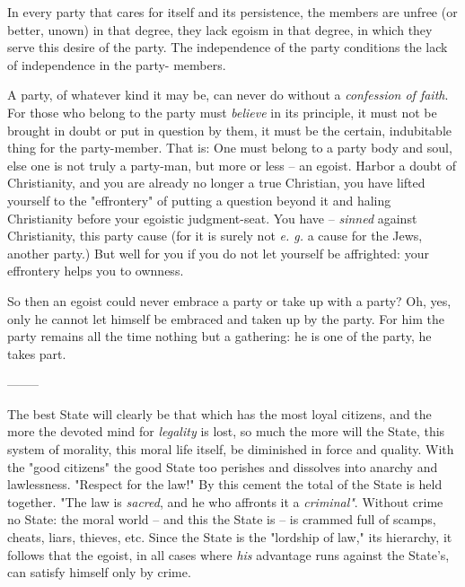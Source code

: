 In every party that cares for itself and its persistence, the members are 
unfree (or better, unown) in that degree, they lack egoism in that degree, in 
which they serve this desire of the party. The independence of the party 
conditions the lack of independence in the party- members.

A party, of whatever kind it may be, can never do without a \textit{confession 
of faith}. For those who belong to the party must \textit{believe} in its 
principle, it must not be brought in doubt or put in question by them, it must 
be the certain, indubitable thing for the party-member. That is: One must 
belong to a party body and soul, else one is not truly a party-man, but more 
or less -- an egoist. Harbor a doubt of Christianity, and you are already no 
longer a true Christian, you have lifted yourself to the "{}effrontery"{} of 
putting a question beyond it and haling Christianity before your egoistic 
judgment-seat. You have -- \textit{sinned} against Christianity, this party 
cause (for it is surely not \textit{e. g.} a cause for the Jews, another 
party.) But well for you if you do not let yourself be affrighted: your 
effrontery helps you to ownness.

So then an egoist could never embrace a party or take up with a party? Oh, 
yes, only he cannot let himself be embraced and taken up by the party. For him 
the party remains all the time nothing but a gathering: he is one of the 
party, he takes part.

\begin{center}
--------\end{center}


The best State will clearly be that which has the most loyal citizens, and the 
more the devoted mind for \textit{legality} is lost, so much the more will the 
State, this system of morality, this moral life itself, be diminished in force 
and quality. With the "{}good citizens"{} the good State too perishes and 
dissolves into anarchy and lawlessness. "{}Respect for the law!"{} By this 
cement the total of the State is held together. "{}The law is \textit{sacred}, 
and he who affronts it a \textit{criminal"{}}. Without crime no State: the 
moral world -- and this the State is -- is crammed full of scamps, cheats, 
liars, thieves, etc. Since the State is the "{}lordship of law,"{} its 
hierarchy, it follows that the egoist, in all cases where \textit{his} 
advantage runs against the State's, can satisfy himself only by crime.


